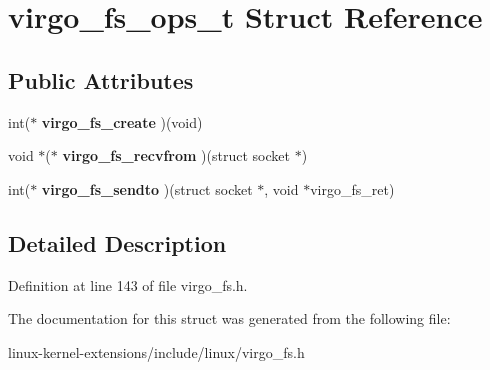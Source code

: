 \hypertarget{structvirgo__fs__ops__t}{\section{virgo\-\_\-fs\-\_\-ops\-\_\-t Struct Reference}
\label{structvirgo__fs__ops__t}
}
\subsection*{Public Attributes}
\begin{DoxyCompactItemize}
\item 
\hypertarget{structvirgo__fs__ops__t_ae9a488f156f56e38a73217e2c4e0a003}{int($\ast$ {\bfseries virgo\-\_\-fs\-\_\-create} )(void)}\label{structvirgo__fs__ops__t_ae9a488f156f56e38a73217e2c4e0a003}

\item 
\hypertarget{structvirgo__fs__ops__t_ab4c459a4396ab2db5efa149c1b5c34cc}{void $\ast$($\ast$ {\bfseries virgo\-\_\-fs\-\_\-recvfrom} )(struct socket $\ast$)}\label{structvirgo__fs__ops__t_ab4c459a4396ab2db5efa149c1b5c34cc}

\item 
\hypertarget{structvirgo__fs__ops__t_ad2dde9438c5d1fd7e72385c30139046d}{int($\ast$ {\bfseries virgo\-\_\-fs\-\_\-sendto} )(struct socket $\ast$, void $\ast$virgo\-\_\-fs\-\_\-ret)}\label{structvirgo__fs__ops__t_ad2dde9438c5d1fd7e72385c30139046d}

\end{DoxyCompactItemize}


\subsection{Detailed Description}


Definition at line 143 of file virgo\-\_\-fs.\-h.



The documentation for this struct was generated from the following file\-:\begin{DoxyCompactItemize}
\item 
linux-\/kernel-\/extensions/include/linux/virgo\-\_\-fs.\-h\end{DoxyCompactItemize}
